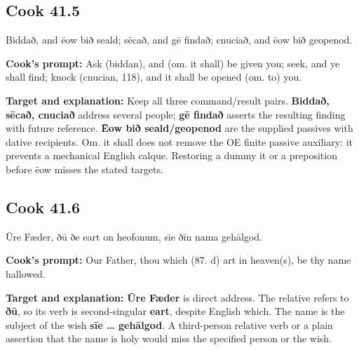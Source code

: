 \par\begin{minipage}{\linewidth}\raggedright
\subsection*{Cook 41.5}

Biddað, and ēow bið seald; sēcað, and gē findað; cnuciað, and ēow bið geopenod.

\textbf{Cook's prompt:} Ask (biddan), and (om. it shall) be given you; seek, and ye shall find; knock (cnucian, 118), and it shall be opened (om. to) you.

\textbf{Target and explanation:} Keep all three command/\allowbreak{}result pairs. \textbf{Biddað, sēcað, cnuciað} address several people; \textbf{gē findað} asserts the resulting finding with future reference. \textbf{Ēow bið seald/\allowbreak{}geopenod} are the supplied passives with dative recipients. Om. it shall does not remove the OE finite passive auxiliary: it prevents a mechanical English calque. Restoring a dummy it or a preposition before ēow misses the stated targets.

\end{minipage}\par\addvspace{4pt}

\par\begin{minipage}{\linewidth}\raggedright
\subsection*{Cook 41.6}

Ūre Fæder, ðū ðe eart on heofonum, sīe ðīn nama gehālgod.

\textbf{Cook's prompt:} Our Father, thou which (87. d) art in heaven(s), be thy name hallowed.

\textbf{Target and explanation:} \textbf{Ūre Fæder} is direct address. The relative refers to \textbf{ðū}, so its verb is second-singular \textbf{eart}, despite English which. The name is the subject of the wish \textbf{sīe … gehālgod}. A third-person relative verb or a plain assertion that the name is holy would miss the specified person or the wish.

\end{minipage}\par\addvspace{4pt}

